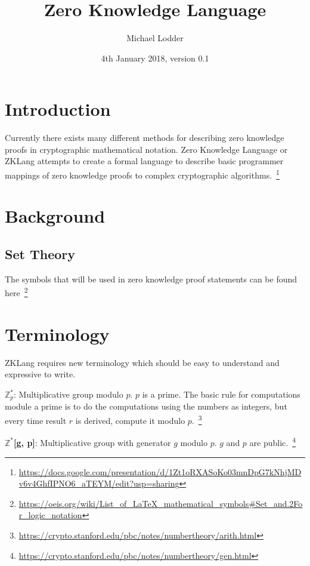 \documentclass[a4paper]{article}
\title{Zero Knowledge Language}
\author{Michael Lodder}
\date{4th January 2018, version 0.1}
\begin{document}
\maketitle

\section{Introduction}

Currently there exists many different methods for describing zero knowledge proofs in cryptographic mathematical notation. Zero Knowledge Language or ZKLang attempts to create a formal language to describe basic programmer mappings of zero knowledge proofs to complex cryptographic algorithms.~\footnote{\url{https://docs.google.com/presentation/d/1Zt1oRXASoKo03mnDpG7kNhjMDv6v4GhfIPNO6_aTEYM/edit?usp=sharing}}

\section{Background}

\subsection{Set Theory}

The symbols that will be used in zero knowledge proof statements can be found here~\footnote{\url{https://oeis.org/wiki/List_of_LaTeX_mathematical_symbols#Set_and.2For_logic_notation}}

\section{Terminology}

ZKLang requires new terminology which should be easy to understand and expressive to write.\newline

\indent $\mathbb{Z}_p^{*}$: Multiplicative group modulo $p$. $p$ is a prime. The basic rule for computations module a prime is to do the computations using the numbers as integers, but every time result $r$ is derived, compute it modulo $p$.~\footnote{\url{https://crypto.stanford.edu/pbc/notes/numbertheory/arith.html}}\newline

$\mathbb{Z^*}$\textbf{[g, p]}: Multiplicative group with generator $g$ modulo $p$. $g$ and $p$ are public.~\footnote{\url{https://crypto.stanford.edu/pbc/notes/numbertheory/gen.html}}\newline
\end{document}
